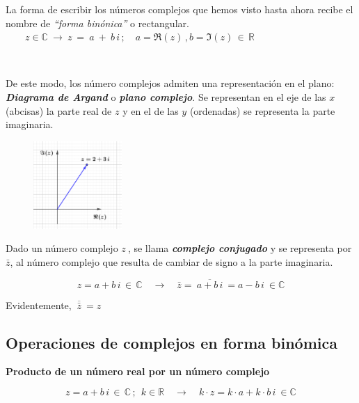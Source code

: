 La forma de escribir los números complejos que hemos visto hasta ahora recibe el nombre de \emph{``forma binónica''} o rectangular.
$\qquad  z\in \mathbb C\ \to \ z \ = \ a\ + \ b\, i \, ; \quad a=\Re(z)\, , b=\Im(z)\,  \in \,  \mathbb  R$

\begin{multicols}{2}
$\quad$

De este modo, los número complejos admiten una representación en el plano: \emph{\textbf{Diagrama de Argand}} o \emph{\textbf{plano complejo}}. Se representan en el eje de las $x$ (abcisas) la parte real de $z$ y en el de las $y$ (ordenadas) se representa la parte imaginaria.

\begin{figure}[H]
	\centering
	\includegraphics[width=0.3\textwidth]{img-c/comp02.png}
\end{figure}
\end{multicols}

\begin{definition}

Dado un número complejo $z\ $, se llama \emph{\textbf{complejo conjugado}} y se representa por $\bar z$, al número	complejo que resulta de cambiar de signo a la parte imaginaria.

$$z=a+b\, i \, \in \, \mathbb C  \quad \to \quad  \bar z=\ \overline{a+b\, i} \ = a-b\,i \ \in \mathbb C$$

Evidentemente, $\ \overline{\bar z}\ = z$
\end{definition}



\subsection{Operaciones de complejos en forma binómica}

\vspace{5mm}
\textbf{Producto de un número real por un número complejo}

$$z=a+b\, i \, \in \, \mathbb C\, ; \ \ k \in \mathbb R \quad \to \quad k\cdot z=k\cdot a + k\cdot b\, i \ \in \mathbb C$$

